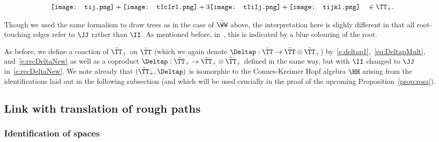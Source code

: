 \documentclass{article}
\begin{document}
\[
\texttt{[image: tij.png]}  + 
\texttt{[image: tIcIrI.png]}  + 
   3 \texttt{[image: tIiIj.png]}  +   \texttt{[image: tijkl.png]}      \quad \in \TT_+.
\]

\begin{remark}
Though we used the same formalism to draw trees as in the case of $\tilde \WW$ above, the interpretation here is slighly different in that all root-touching edges refer to $\JJ$ rather than $\II$. As mentioned before, in~\cite{BHZ16}, this is indicated by a blue colouring of the root.
\end{remark} 


As before, we define a coaction of $\tilde \TT_+$ on $\tilde \TT$ (which we again denote $\Deltap : \tilde \TT \rightarrow \tilde \TT\otimes \tilde \TT_+$) by~\eqref{e:deltap1},~\eqref{eq:DeltapMult}, and~\eqref{e:recDeltaNew} as well as a coproduct $\Deltap : \tilde \TT_+ \rightarrow \tilde \TT_+ \otimes \tilde \TT_+$ defined in the same way, but with $\II$ changed to $\JJ$ in~\eqref{e:recDeltaNew}. We note already that $(\tilde \TT_+,\Deltap)$ is isomorphic to the Connes-Kreimer Hopf algebra $\HH$ arising from the identifications laid out in the following subsection (and which will be used crucially in the proof of the upcoming Proposition~\ref{prop:rosa}).



\subsection{Link with translation of rough paths}

\subsubsection{Identification of spaces} 

\end{document}
